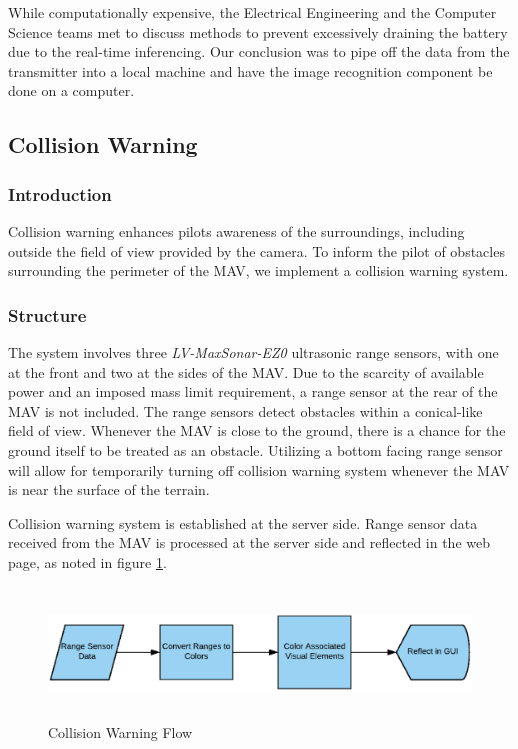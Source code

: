 \documentclass[onecolumn, draftclsnofoot, 10pt, compsoc]{IEEEtran}
\begin{document}
While computationally expensive, the Electrical Engineering and the Computer Science teams met to discuss methods to prevent excessively draining the battery due to the real-time inferencing. Our conclusion was to pipe off the data from the transmitter into a local machine and have the image recognition component be done on a computer.


\subsection{Collision Warning}
\subsubsection{Introduction}
Collision warning enhances pilot\textquotesingle s awareness of the surroundings, including outside the field of view provided by the camera. To inform the pilot of obstacles surrounding the perimeter of the MAV, we implement a collision warning system.

\subsubsection{Structure}
The system involves three \textit{LV-MaxSonar-EZ0} ultrasonic range sensors, with one at the front and two at the sides of the MAV. Due to the scarcity of available power and an imposed mass limit requirement, a range sensor at the rear of the MAV is not included. The range sensors detect obstacles within a conical-like field of view. Whenever the MAV is close to the ground, there is a chance for the ground itself to be treated as an obstacle. Utilizing a bottom facing range sensor will allow for temporarily turning off collision warning system whenever the MAV is near the surface of the terrain.

Collision warning system is established at the server side. Range sensor data received from the MAV is processed at the server side and reflected in the web page, as noted in figure \ref{fig:ColWar}.
\begin{figure}[h]
    \centering
    \includegraphics[height=3.5cm]{graphics/collision_warning.eps}
    \caption{Collision Warning Flow}
    \label{fig:ColWar}
\end{figure}
\end{document}
